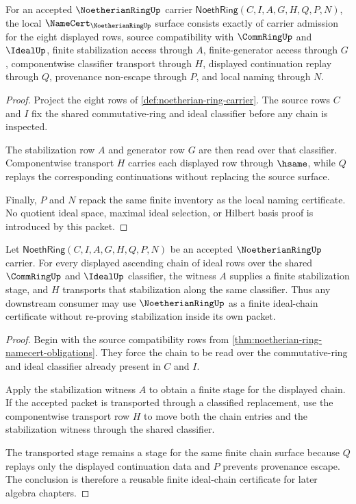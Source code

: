\begin{theorem}\label{thm:noetherian-ring-namecert-obligations}
For an accepted $\NoetherianRingUp$ carrier $\mathsf{NoethRing}(C,I,A,G,H,Q,P,N)$, the local $\NameCert_{\NoetherianRingUp}$ surface consists exactly of carrier admission for the eight displayed rows, source compatibility with $\CommRingUp$ and $\IdealUp$, finite stabilization access through $A$, finite-generator access through $G$, componentwise classifier transport through $H$, displayed continuation replay through $Q$, provenance non-escape through $P$, and local naming through $N$.
\end{theorem}
\begin{proof}
Project the eight rows of \autoref{def:noetherian-ring-carrier}. The source rows $C$ and $I$ fix the shared commutative-ring and ideal classifier before any chain is inspected.

The stabilization row $A$ and generator row $G$ are then read over that classifier. Componentwise transport $H$ carries each displayed row through $\hsame$, while $Q$ replays the corresponding continuations without replacing the source surface.

Finally, $P$ and $N$ repack the same finite inventory as the local naming certificate. No quotient ideal space, maximal ideal selection, or Hilbert basis proof is introduced by this packet.
\end{proof}

\begin{theorem}\label{thm:noetherian-ring-ascending-chain-stability}
Let $\mathsf{NoethRing}(C,I,A,G,H,Q,P,N)$ be an accepted $\NoetherianRingUp$ carrier. For every displayed ascending chain of ideal rows over the shared $\CommRingUp$ and $\IdealUp$ classifier, the witness $A$ supplies a finite stabilization stage, and $H$ transports that stabilization along the same classifier. Thus any downstream consumer may use $\NoetherianRingUp$ as a finite ideal-chain certificate without re-proving stabilization inside its own packet.
\end{theorem}
\begin{proof}
Begin with the source compatibility rows from \autoref{thm:noetherian-ring-namecert-obligations}. They force the chain to be read over the commutative-ring and ideal classifier already present in $C$ and $I$.

Apply the stabilization witness $A$ to obtain a finite stage for the displayed chain. If the accepted packet is transported through a classified replacement, use the componentwise transport row $H$ to move both the chain entries and the stabilization witness through the shared classifier.

The transported stage remains a stage for the same finite chain surface because $Q$ replays only the displayed continuation data and $P$ prevents provenance escape. The conclusion is therefore a reusable finite ideal-chain certificate for later algebra chapters.
\end{proof}

